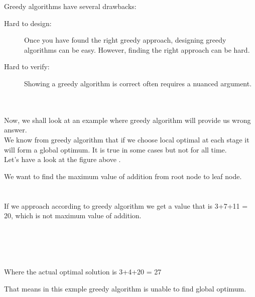 Greedy algorithms have several drawbacks:


\begin{description}
\item[ Hard to design:]  Once you have found the  right greedy approach, designing 
greedy algorithms can be easy. However, finding the right approach can be hard.
\item[Hard to verify:] Showing a greedy algorithm is correct often requires a 
nuanced argument.

\end{description}

~~~~ \\ \\ 
Now, we shall look at an example where greedy algorithm will provide us wrong answer.\\
We know from greedy algorithm that if we choose  local optimal at each stage it will  form a global optimum. It is true in some cases but not for all time.\\

Let's have a look at the figure above .
	 
We want to find the maximum value of addition from root node to leaf node.
~~~\\ \\
 ~~~\\
If we approach according to greedy algorithm we get a value that is 3+7+11 = 20, which is not maximum value of addition.

~~~\\ \\ \\
 ~~~\\
Where the actual optimal solution is 3+4+20 = 27

That means in this exmple greedy algorithm is unable to find global optimum.
	